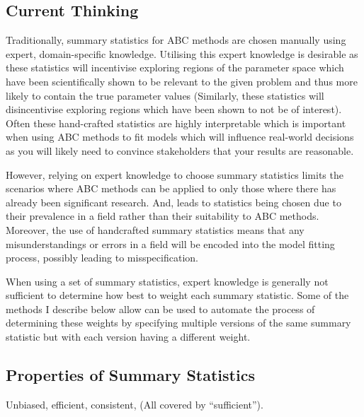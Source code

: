 \documentclass[11pt,a4paper,margin=0]{article}
\theoremstyle{break}
\begin{document}
\subsection*{Current Thinking}\label{sec_summary_stats_current_thinking}

  Traditionally, summary statistics for ABC methods are chosen manually using expert, domain-specific knowledge. Utilising this expert knowledge is desirable as these statistics will incentivise exploring regions of the parameter space which have been scientifically shown to be relevant to the given problem and thus more likely to contain the true parameter values (Similarly, these statistics will disincentivise exploring regions which have been shown to not be of interest). %
  Often these hand-crafted statistics are highly interpretable which is important when using ABC methods to fit models which will influence real-world decisions as you will likely need to convince stakeholders that your results are reasonable.


  \par However, relying on expert knowledge to choose summary statistics limits the scenarios where ABC methods can be applied to only those where there has already been significant research. And, leads to statistics being chosen due to their prevalence in a field rather than their suitability to ABC methods. Moreover, the use of handcrafted summary statistics means that any misunderstandings or errors in a field will be encoded into the model fitting process, possibly leading to misspecification.

  \par When using a set of summary statistics, expert knowledge is generally not sufficient to determine how best to weight each summary statistic. Some of the methods I describe below allow can be used to automate the process of determining these weights by specifying multiple versions of the same summary statistic but with each version having a different weight.

\subsection{Properties of Summary Statistics}
  \par Unbiased, efficient, consistent, (All covered by ``sufficient'').

\end{document}
